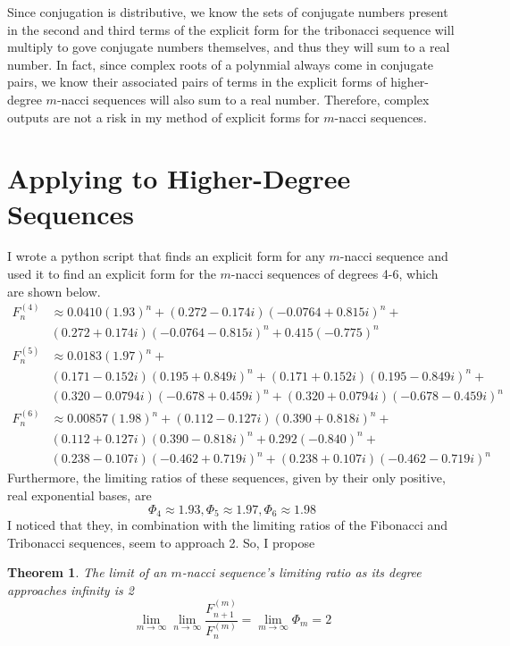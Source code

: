 \documentclass[11pt]{article}
\newtheorem{theorem}{Theorem}[section]
\begin{document}
Since conjugation is distributive, we know the sets of conjugate numbers present in the second and third terms of the explicit form for the tribonacci sequence will multiply to gove conjugate numbers themselves, and thus they will sum to a real number. In fact, since complex roots of a polynmial always come in conjugate pairs, we know their associated pairs of terms in the explicit forms of higher-degree \(m\)-nacci sequences will also sum to a real number. Therefore, complex outputs are not a risk in my method of explicit forms for \(m\)-nacci sequences.



\section{Applying to Higher-Degree Sequences}
I wrote a python script that finds an explicit form for any \(m\)-nacci sequence and used it to find an explicit form for the \(m\)-nacci sequences of degrees 4-6, which are shown below. 
\begin{align*}
    F^{(4)}_n & \approx 0.0410(1.93)^n + (0.272-0.174i)(-0.0764+0.815i)^n+ \\ & (0.272+0.174i)(-0.0764-0.815i)^n + 0.415(-0.775)^n \\
    F^{(5)}_n & \approx 0.0183(1.97)^n + \\ & (0.171-0.152i)(0.195+0.849i)^n + (0.171+0.152i)(0.195-0.849i)^n + \\ & (0.320-0.0794i)(-0.678+0.459i)^n + (0.320+0.0794i)(-0.678-0.459i)^n \\
    F^{(6)}_n & \approx 0.00857(1.98)^n + (0.112-0.127i)(0.390 + 0.818i)^n + \\ & (0.112 + 0.127i)(0.390-0.818i)^n + 0.292(-0.840)^n + \\ & (0.238-0.107i)(-0.462 + 0.719i)^n + (0.238 + 0.107i)(-0.462-0.719i)^n
\end{align*}
Furthermore, the limiting ratios of these sequences, given by their only positive, real exponential bases, are 
\[\Phi_4\approx 1.93, \Phi_5\approx 1.97, \Phi_6\approx 1.98\]
I noticed that they, in combination with the limiting ratios of the Fibonacci and Tribonacci sequences, seem to approach 2. So, I propose
\begin{theorem}
    The limit of an \(m\)-nacci sequence's limiting ratio as its degree approaches infinity is 2
    \[\lim_{m\to\infty} \lim_{n\to\infty}\frac{F^{(m)}_{n+1}}{F^{(m)}_{n}}=\lim_{m\to\infty} \Phi_m = 2 \]
\end{theorem}
\end{document}
